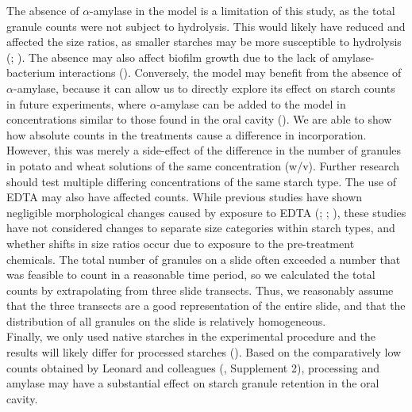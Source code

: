 \documentclass[
  b5paper,
]{book}
\begin{document}
The absence of \(\alpha\)-amylase in the model is a limitation of this
study, as the total granule counts were not subject to hydrolysis. This
would likely have reduced and affected the size ratios, as smaller
starches may be more susceptible to hydrolysis
(;
). The absence
may also affect biofilm growth due to the lack of amylase-bacterium
interactions (). Conversely, the model may benefit from the absence of
\(\alpha\)-amylase, because it can allow us to directly explore its
effect on starch counts in future experiments, where \(\alpha\)-amylase
can be added to the model in concentrations similar to those found in
the oral cavity
(). We are able to show how absolute counts in the treatments cause
a difference in incorporation. However, this was merely a side-effect of
the difference in the number of granules in potato and wheat solutions
of the same concentration (w/v). Further research should test multiple
differing concentrations of the same starch type. The use of EDTA may
also have affected counts. While previous studies have shown negligible
morphological changes caused by exposure to EDTA
(; ;
), these studies
have not considered changes to separate size categories within starch
types, and whether shifts in size ratios occur due to exposure to the
pre-treatment chemicals. The total number of granules on a slide often
exceeded a number that was feasible to count in a reasonable time
period, so we calculated the total counts by extrapolating from three
slide transects. Thus, we reasonably assume that the three transects are
a good representation of the entire slide, and that the distribution of
all granules on the slide is relatively homogeneous.\\
Finally, we only used native starches in the experimental procedure and
the results will likely differ for processed starches
(). Based
on the comparatively low counts obtained by Leonard and colleagues
(, Supplement 2),
processing and amylase may have a substantial effect on starch granule
retention in the oral cavity.
\end{document}

